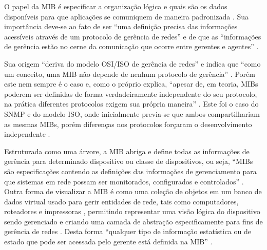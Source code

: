 \documentclass[twoside,english,brazilian]{UNISINOSmonografia}
\begin{document}
O papel da MIB é especificar a organização lógica e quais são os dados 
disponíveis para que aplicações se comuniquem de maneira padronizada 
\cite{Silva2005}.
Sua importância deve-se ao fato de ser 
``uma definição precisa das informações acessíveis através de um protocolo de 
gerência de redes''
\cite[p.~152]{Leinwand1996} 
e de que as
``informações de gerência estão no cerne da comunicação que ocorre entre 
gerentes e agentes''
\cite[p.~227]{Clemm2006}.

Sua origem ``deriva do modelo OSI/ISO de gerência de redes''
\cite[p.~46]{Ding2009} 
e indica que
``como um conceito, uma MIB não depende de nenhum protocolo de gerência''
\cite[p.~222]{Clemm2006}.
Porém este nem sempre é o caso e, como o próprio  
explica, 
``apesar de, em teoria, MIBs poderem ser definidas de forma verdadeiramente 
independente do seu protocolo, na prática diferentes protocolos exigem sua 
própria maneira''
.
Este foi o caso do SNMP e do modelo ISO, onde inicialmente previa-se que ambos 
compartilhariam as mesmas MIBs, porém diferenças nos protocolos forçaram o 
desenvolvimento independente \cite{Hunt1997,stallings1999snmp,Leinwand1996}.

Estruturada como uma árvore, a MIB abriga e define todas as informações de 
gerência para determinado dispositivo ou classe de dispositivos, ou seja, 
``MIBs são especificações contendo as definições das informações de 
gerenciamento para que sistemas em rede possam ser monitorados, configurados e 
controlados''
\cite[p.~1]{perkins1997understanding}.
Outra forma de visualizar a MIB é como uma coleção de objetos em um banco de 
dados virtual usado para gerir entidades de rede, tais como computadores, 
roteadores e impressoras 
\cite{Ding2009}, permitindo representar uma visão lógica do dispositivo sendo 
gerenciado e criando uma camada de abstração especificamente para fins de 
gerência de redes 
\cite{Clemm2006}.
Desta forma 
``qualquer tipo de informação estatística ou de estado que pode ser acessada 
pelo gerente está definida na MIB''
\cite[p.~4]{Mauro2009}.
\end{document}
